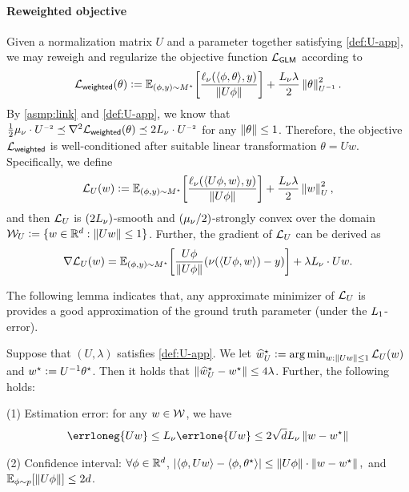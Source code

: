 \newcommand{\constrth}{\nrm{\theta}\leq 1}
\newcommand{\constrw}{\nrm{Uw}\leq 1}
\paragraph{Reweighted objective}
Given a normalization matrix $U$ and a parameter together satisfying \eqref{def:U-app}, we may reweigh and regularize the objective function $\mathcal{L}_{\mathsf{GLM}}$ according to  
\begin{align*}
    \mathcal{L}_{\mathsf{weighted}}(\theta)\mathrel{\mathop:}= \mathbb{E}_{(\phi,y)\sim M^\star}{\left[  \frac{\ell_{\nu}(\langle \phi,\theta\rangle, y)}{\left\|U\phi\right\|}  \right]}+\frac{L_\nu\lambda}2\left\|\theta\right\|^2_{U^{{\scriptscriptstyle-1}}}.
\end{align*}
By \cref{asmp:link} and \eqref{def:U-app}, we know that $\frac12\mu_\nu\cdot  U^{{\scriptscriptstyle-2}} \preceq \nabla^2 \mathcal{L}_{\mathsf{weighted}}(\theta) \preceq 2L_\nu \cdot U^{{\scriptscriptstyle-2}}$ for any $\constrth$.
Therefore, the objective $\mathcal{L}_{\mathsf{weighted}}$ is well-conditioned after suitable linear transformation $\theta=Uw$. Specifically, we define
\begin{align}\label{def:Lnew}
    \mathcal{L}_{U}(w)\mathrel{\mathop:}= \mathbb{E}_{(\phi,y)\sim M^\star}{\left[  \frac{\ell_{\nu}(\langle U\phi,w\rangle, y)}{\left\|U\phi\right\|}  \right]}+\frac{L_\nu\lambda}{2}\left\|w\right\|^2_{U},
\end{align}
and then $\mathcal{L}_{U}$ is $(2L_\nu)$-smooth and $(\mu_\nu/2)$-strongly convex over the domain $\cW_U\defeq \set{w\in\R^d: \constrw}$. Further, the gradient of $\mathcal{L}_{U}$ can be derived as
\begin{align*}
    \nabla \mathcal{L}_{U}(w)=\mathbb{E}_{(\phi,y)\sim M^\star}{\left[  \frac{U\phi}{\left\|U\phi\right\|}{\left(  \nu(\langle U\phi, w\rangle)-y  \right)} \right]} +\lambda L_\nu \cdot Uw.
\end{align*}

The following lemma indicates that, any approximate minimizer of $\mathcal{L}_{U}$ is provides a good approximation of the ground truth parameter (under the $L_1$-error).

\newcommand{\wstar}{w^\star}
\newcommand{\hwst}{\widehat{w}^\star_U}
\begin{lemma}\label{lem:Lnew}
Suppose that $(U,\lambda)$ satisfies \eqref{def:U-app}. We let $\hwst\defeq \argmin_{w: \nrm{Uw}\leq 1} \Lnew(w)$ and $\wstar\defeq U^{-1}\ths$.
Then it holds that $\nrm{\hwst-\wstar}\leq 4\lambda$. Further, the following holds:

(1) Estimation error: for any $w\in\mathcal{W}$, we have
\begin{align}\label{eq:l1-est-error-bound}
    \errloneg{Uw}\leq \Lipg\errlone{Uw}\leq 2\sqrt{d}\Lipg \nrm{w-\wstar}
\end{align}

(2) Confidence interval: $\forall\phi\in\mathbb{R}^d$, $\abs{ \lr \x, Uw\rr - \lr \x,\ths \rr }\leq \nrm{U\x}\cdot \nrm{w-\wstar},$
and $\mathbb{E}_{\phi\sim p}{\left[ \left\|U\phi\right\| \right]}\leq 2d$.
\end{lemma}

